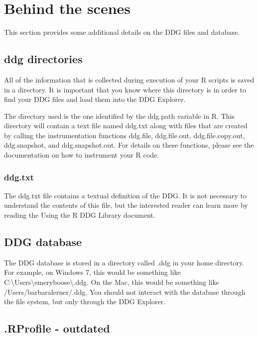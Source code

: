 \documentclass[12pt]{article}
\begin{document}
{\section[Behind the scenes]{Behind the scenes}
{\mdseries\upshape\color{black}
This section provides some additional details on the DDG files and database.}

\subsection{ddg directories}

{\mdseries\upshape\color{black}
All of the information that is collected during execution of your R scripts is saved in a directory. It is important that you know where this directory is in order to find your DDG files and load them into the DDG Explorer.}

{\mdseries\upshape\color{black}
The directory used is the one identified by the ddg.path variable in R. This directory will contain a text file named ddg.txt along with files that are created by calling the instrumentation functions ddg.file, ddg.file.out, ddg.file.copy.out, ddg.snapshot, and ddg.snapshot.out. For details on these functions, please see the documentation on how to instrument your R code.}

\subsubsection{ddg.txt}

{\mdseries\upshape\color{black}
The ddg.txt file contains a textual definition of the DDG. It is not necessary to understand the contents of this file, but the interested reader can learn more by reading the Using the R DDG Library document.}

\subsection{DDG database}

{\mdseries\upshape\color{black}
The DDG database is stored in a directory called .ddg in your home directory. For example, on Windows 7, this would be something like C:{\textbackslash}Users{\textbackslash}emeryboose{\textbackslash}.ddg. On the Mac, this would be something like /Users/barbaralerner/.ddg. You should not interact with the database through the file system, but only through the DDG Explorer.}

\subsection{.RProfile - outdated}

}
\end{document}

